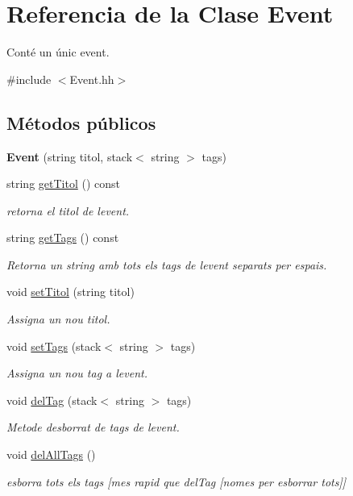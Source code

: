 \hypertarget{class_event}{}\section{Referencia de la Clase Event}
\label{class_event}


Conté un únic event.  




{\ttfamily \#include $<$Event.\+hh$>$}

\subsection*{Métodos públicos}
\begin{DoxyCompactItemize}
\item 
\hypertarget{class_event_aa37d3f6b20a3ba3d174962b8cb76b64e}{}{\bfseries Event} (string titol, stack$<$ string $>$ tags)\label{class_event_aa37d3f6b20a3ba3d174962b8cb76b64e}

\item 
string \hyperlink{class_event_a5a674a90725e7589757e98de7f109243}{get\+Titol} () const 
\begin{DoxyCompactList}\small\item\em retorna el titol de l\textquotesingle{}event. \end{DoxyCompactList}\item 
string \hyperlink{class_event_ad17c21131ed964fc3498689e9f7413b4}{get\+Tags} () const 
\begin{DoxyCompactList}\small\item\em Retorna un string amb tots els tags de l\textquotesingle{}event separats per espais. \end{DoxyCompactList}\item 
void \hyperlink{class_event_a16ed22cc72c0249ade170184f280a1d8}{set\+Titol} (string titol)
\begin{DoxyCompactList}\small\item\em Assigna un nou titol. \end{DoxyCompactList}\item 
void \hyperlink{class_event_a3f8e092c3f470034b0ae8273d8ec5cbb}{set\+Tags} (stack$<$ string $>$ tags)
\begin{DoxyCompactList}\small\item\em Assigna un nou tag a l\textquotesingle{}event. \end{DoxyCompactList}\item 
void \hyperlink{class_event_a7bd83fe91f68446aee88fd69bd9ee388}{del\+Tag} (stack$<$ string $>$ tags)
\begin{DoxyCompactList}\small\item\em Metode d\textquotesingle{}esborrat de tags de l\textquotesingle{}event. \end{DoxyCompactList}\item 
void \hyperlink{class_event_a58e213ecfa7b2beedc275a2b4dc86eaf}{del\+All\+Tags} ()
\begin{DoxyCompactList}\small\item\em esborra tots els tags \mbox{[}mes rapid que del\+Tag \mbox{[}nomes per esborrar tots\mbox{]}\mbox{]} \end{DoxyCompactList}\end{DoxyCompactItemize}


